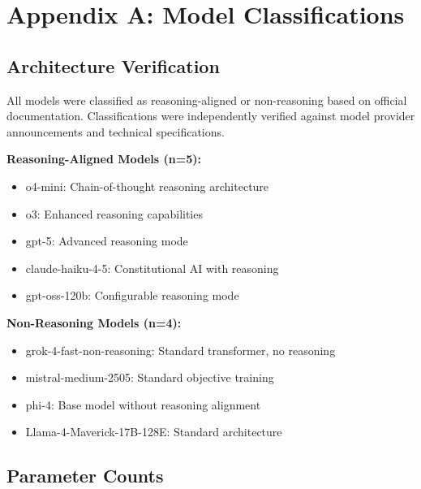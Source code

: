 
\section*{Appendix A: Model Classifications}

\subsection*{Architecture Verification}

All models were classified as reasoning-aligned or non-reasoning based on official
documentation. Classifications were independently verified against model provider
announcements and technical specifications.

\textbf{Reasoning-Aligned Models (n=5):}
\begin{itemize}
\item o4-mini: Chain-of-thought reasoning architecture \citep{openai_o4_mini}
\item o3: Enhanced reasoning capabilities \citep{openai_o3}
\item gpt-5: Advanced reasoning mode \citep{openai_gpt5}
\item claude-haiku-4-5: Constitutional AI with reasoning \citep{anthropic_haiku}
\item gpt-oss-120b: Configurable reasoning mode \citep{openai_gpt_oss}
\end{itemize}

\textbf{Non-Reasoning Models (n=4):}
\begin{itemize}
\item grok-4-fast-non-reasoning: Standard transformer, no reasoning \citep{xai_grok4}
\item mistral-medium-2505: Standard objective training \citep{mistral_medium}
\item phi-4: Base model without reasoning alignment \citep{microsoft_phi4}
\item Llama-4-Maverick-17B-128E: Standard architecture \citep{meta_llama4}
\end{itemize}

\subsection*{Parameter Counts}

